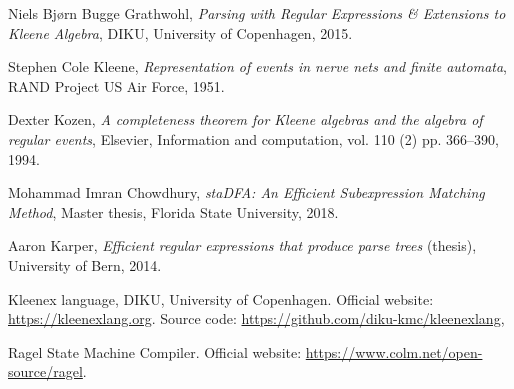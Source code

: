 \documentclass[]{article}
\begin{document}
\begin{thebibliography}{99}
    Niels Bj{\o}rn Bugge Grathwohl,
    \textit{Parsing with Regular Expressions \& Extensions to Kleene Algebra},
    DIKU, University of Copenhagen,
    2015.

    Stephen Cole Kleene,
    \textit{Representation of events in nerve nets and finite automata},
    RAND Project US Air Force,
    1951.

    Dexter Kozen,
    \textit{A completeness theorem for {Kleene} algebras and the algebra of regular events},
    Elsevier,
    Information and computation,
    vol. 110 (2)
    pp. 366--390,
    1994.

    Mohammad Imran Chowdhury,
    \textit{staDFA: An Efficient Subexpression Matching Method},
    Master thesis,
    Florida State University,
    2018.

    Aaron Karper,
    \textit{Efficient regular expressions that produce parse trees} (thesis),
    University of Bern,
    2014.

    Kleenex language,
    DIKU, University of Copenhagen.
    Official website: \url{https://kleenexlang.org}.
    Source code: \url{https://github.com/diku-kmc/kleenexlang},

    Ragel State Machine Compiler.
    Official website: \url{https://www.colm.net/open-source/ragel}.

\end{thebibliography}
\end{document}
